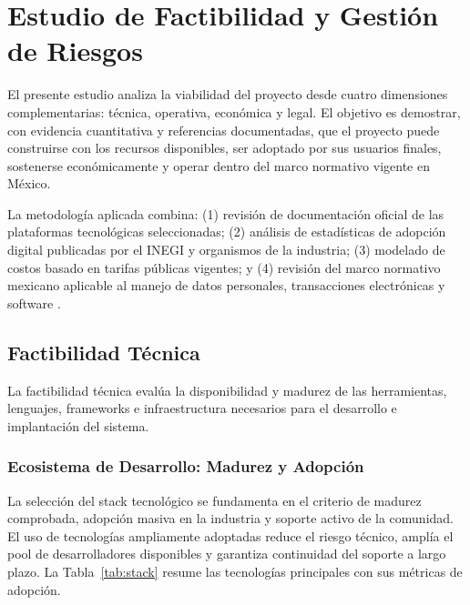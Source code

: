 \section{Estudio de Factibilidad y Gestión de Riesgos}

El presente estudio analiza la viabilidad del proyecto desde cuatro dimensiones
complementarias: técnica, operativa, económica y legal. El objetivo es demostrar,
con evidencia cuantitativa y referencias documentadas, que el proyecto puede
construirse con los recursos disponibles, ser adoptado por sus usuarios finales,
sostenerse económicamente y operar dentro del marco normativo vigente en México.

La metodología aplicada combina: (1) revisión de documentación oficial de las
plataformas tecnológicas seleccionadas; (2) análisis de estadísticas de adopción
digital publicadas por el INEGI y organismos de la industria; (3) modelado de
costos basado en tarifas públicas vigentes; y (4) revisión del marco normativo
mexicano aplicable al manejo de datos personales, transacciones electrónicas y
software \cite{nextjs, supabase_pricing, prisma_docs, state_of_js_2023, stackoverflow_2023_results}.

\FloatBarrier
\subsection{Factibilidad Técnica}

La factibilidad técnica evalúa la disponibilidad y madurez de las herramientas,
lenguajes, frameworks e infraestructura necesarios para el desarrollo e implantación
del sistema.

\subsubsection{Ecosistema de Desarrollo: Madurez y Adopción}

La selección del stack tecnológico se fundamenta en el criterio de madurez
comprobada, adopción masiva en la industria y soporte activo de la comunidad.
El uso de tecnologías ampliamente adoptadas reduce el riesgo técnico, amplía el
pool de desarrolladores disponibles y garantiza continuidad del soporte a largo
plazo. La Tabla~\ref{tab:stack} resume las tecnologías principales con sus métricas
de adopción.

